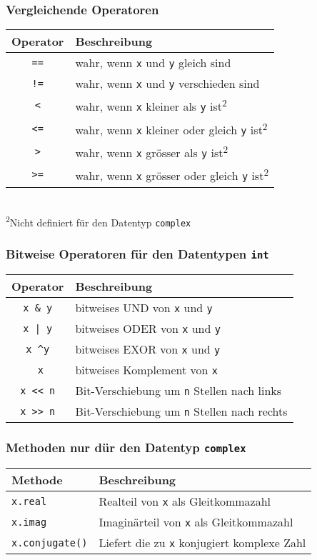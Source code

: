 \subsubsection{Vergleichende Operatoren}
\begin{tabular}{|c|l|}
	\hline 
	\textbf{Operator} &\textbf{Beschreibung}\\ 
	\hline 
	\texttt{==} &wahr, wenn \texttt{x} und \texttt{y} gleich sind\\ 
	\texttt{!=} &wahr, wenn \texttt{x} und \texttt{y} verschieden sind\\ 
	\texttt{<} &wahr, wenn \texttt{x} kleiner als \texttt{y} ist\textsuperscript{2}\\ 
	\texttt{<=} &wahr, wenn \texttt{x} kleiner oder gleich \texttt{y} ist\textsuperscript{2}\\ 
	\texttt{>} &wahr, wenn \texttt{x} grösser als \texttt{y} ist\textsuperscript{2}\\ 
	\texttt{>=} &wahr, wenn \texttt{x} grösser oder gleich \texttt{y} ist\textsuperscript{2}\\ 
	\hline 
\end{tabular}\\
\textsuperscript{2}Nicht definiert für den Datentyp \texttt{complex}\\

\subsubsection{Bitweise Operatoren für den Datentypen \texttt{int}}
\begin{tabular}{|c|l|}
	\hline 
	\textbf{Operator} &\textbf{Beschreibung}\\ 
	\hline 
	\texttt{x \& y} &bitweises UND von \texttt{x} und \texttt{y}\\ 
	\texttt{x | y} &bitweises ODER von \texttt{x} und \texttt{y}\\
	\texttt{x \textasciicircum y} &bitweises EXOR von \texttt{x} und \texttt{y}\\ 
	\texttt{~x} &bitweises Komplement von \texttt{x}\\ 
	\texttt{x << n} &Bit-Verschiebung um \texttt{n} Stellen nach links\\ 
	\texttt{x >> n} &Bit-Verschiebung um \texttt{n} Stellen nach rechts\\ 
	\hline 
\end{tabular}

\subsubsection{Methoden nur dür den Datentyp \texttt{complex}}
\begin{tabular}{|l|l|}
	\hline 
	\textbf{Methode} &\textbf{Beschreibung}\\ 
	\hline 
	\texttt{x.real} &Realteil von \texttt{x} als Gleitkommazahl\\
	\texttt{x.imag} &Imaginärteil von \texttt{x} als Gleitkommazahl\\ 
	\texttt{x.conjugate()} &Liefert die zu \texttt{x} konjugiert komplexe Zahl\\  
	\hline 
\end{tabular}


